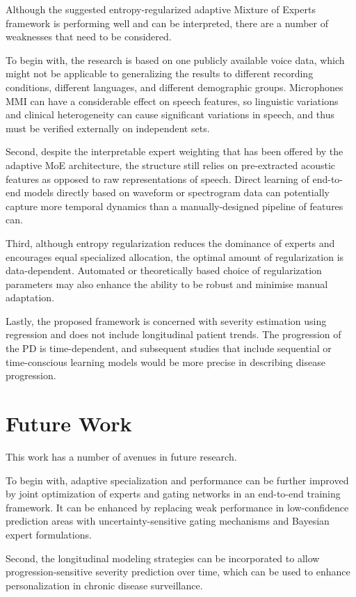 \documentclass{customIEEEsingle}
\begin{document}
	Although the suggested entropy-regularized adaptive Mixture of Experts framework is performing well and can be interpreted, there are a number of weaknesses that need to be considered.
	
	To begin with, the research is based on one publicly available voice data, which might not be applicable to generalizing the results to different recording conditions, different languages, and different demographic groups. Microphones MMI can have a considerable effect on speech features, so linguistic variations and clinical heterogeneity can cause significant variations in speech, and thus must be verified externally on independent sets.
	
	Second, despite the interpretable expert weighting that has been offered by the adaptive MoE architecture, the structure still relies on pre-extracted acoustic features as opposed to raw representations of speech. Direct learning of end-to-end models directly based on waveform or spectrogram data can potentially capture more temporal dynamics than a manually-designed pipeline of features can.
	
	Third, although entropy regularization reduces the dominance of experts and encourages equal specialized allocation, the optimal amount of regularization is data-dependent. Automated or theoretically based choice of regularization parameters may also enhance the ability to be robust and minimise manual adaptation.
	
	Lastly, the proposed framework is concerned with severity estimation using regression and does not include longitudinal patient trends. The progression of the PD is time-dependent, and subsequent studies that include sequential or time-conscious learning models would be more precise in describing disease progression.
	
	\section{Future Work}\label{sec:future}
	
	This work has a number of avenues in future research.
	
	To begin with, adaptive specialization and performance can be further improved by joint optimization of experts and gating networks in an end-to-end training framework. It can be enhanced by replacing weak performance in low-confidence prediction areas with uncertainty-sensitive gating mechanisms and Bayesian expert formulations.
	
	Second, the longitudinal modeling strategies can be incorporated to allow progression-sensitive severity prediction over time, which can be used to enhance personalization in chronic disease surveillance.
	
\end{document}
